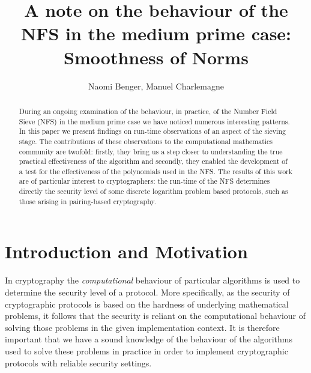 \documentclass[a4paper, 10pt, envcountsect, runningheads]{article}
\numberwithin{figure}{section}
\numberwithin{equation}{section}
\begin{document}
\title{A note on the behaviour of the NFS in the medium prime case: Smoothness of Norms}
\author{Naomi Benger, %
Manuel Charlemagne}%
\maketitle
\begin{abstract}
During an ongoing examination of the behaviour, in practice, of the Number Field Sieve (NFS) in the medium prime case we have noticed numerous interesting patterns. In this paper we present findings on run-time observations of an aspect of the sieving stage. The contributions of these observations to the computational mathematics community are twofold: firstly, they bring us a step closer to understanding the true practical effectiveness of the algorithm and secondly, they enabled the development of a test for the effectiveness of the polynomials used in the NFS. The results of this work are of particular interest to cryptographers: the run-time of the NFS determines directly the security level of some discrete logarithm problem based protocols, such as those arising in pairing-based cryptography.
\end{abstract}
\section{Introduction and Motivation}
In cryptography the {\em computational} behaviour of particular algorithms is used to determine the security level of a protocol. More specifically, as the security of cryptographic protocols is based on the hardness of underlying mathematical problems, it follows that the security is reliant on the computational behaviour of solving those problems in the given implementation context. It is therefore important that we have a sound knowledge of the behaviour of the algorithms used to solve these problems in practice in order to implement cryptographic protocols with reliable security settings.
\end{document}
